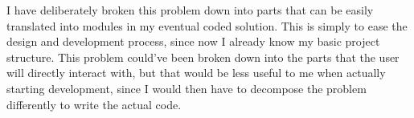 \documentclass[../main.tex]{subfiles}
\begin{document}
I have deliberately broken this problem down into parts that can be easily translated into modules in my eventual coded solution. This is simply to ease the design and development process, since now I already know my basic project structure. This problem could've been broken down into the parts that the user will directly interact with, but that would be less useful to me when actually starting development, since I would then have to decompose the problem differently to write the actual code.
\end{document}

